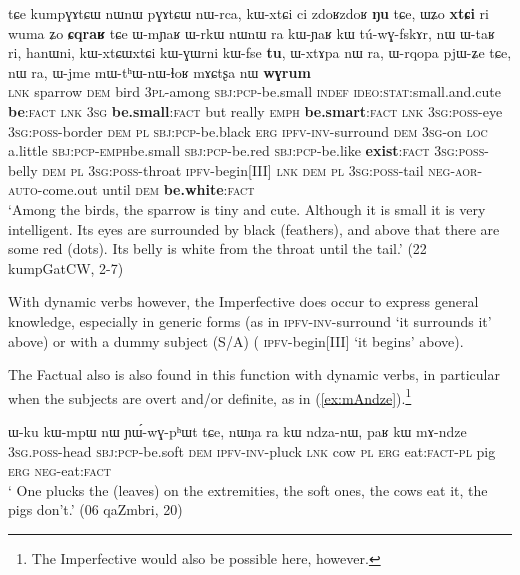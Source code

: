 \begin{exe}
\ex \label{ex:kumpGAtCW}
\gll tɕe kumpɣɤtɕɯ nɯnɯ pɣɤtɕɯ nɯ-rca, kɯ-xtɕi ci zdoʁzdoʁ \textbf{ŋu} tɕe, ɯʑo \textbf{xtɕi} ri wuma ʑo \textbf{ɕqraʁ} tɕe ɯ-mɲaʁ ɯ-rkɯ nɯnɯ ra kɯ-ɲaʁ kɯ tú-wɣ-fskɤr, nɯ ɯ-taʁ ri, hanɯni, kɯ-xtɕɯ\redp{}xtɕi kɯ-ɣɯrni kɯ-fse \textbf{tu}, ɯ-xtɤpa nɯ ra, ɯ-rqopa pjɯ-ʑe tɕe, nɯ ra, ɯ-jme mɯ-tʰɯ-nɯ-ɬoʁ mɤɕtʂa nɯ \textbf{wɣrum}  \\
\textsc{lnk} sparrow \textsc{dem} bird \textsc{3pl}-among \textsc{sbj}:\textsc{pcp}-be.small \textsc{indef} \textsc{ideo}:\textsc{stat}:small.and.cute \textbf{be}:\textsc{fact} \textsc{lnk}  \textsc{3sg} \textbf{be.small}:\textsc{fact} but really \textsc{emph} \textbf{be.smart}:\textsc{fact}  \textsc{lnk}  \textsc{3sg}:\textsc{poss}-eye \textsc{3sg}:\textsc{poss}-border \textsc{dem}  \textsc{pl}  \textsc{sbj}:\textsc{pcp}-be.black \textsc{erg} \textsc{ipfv}-\textsc{inv}-surround \textsc{dem} \textsc{3sg}-on \textsc{loc} a.little \textsc{sbj}:\textsc{pcp}-\textsc{emph}\redp{}be.small \textsc{sbj}:\textsc{pcp}-be.red \textsc{sbj}:\textsc{pcp}-be.like \textbf{exist}:\textsc{fact} \textsc{3sg}:\textsc{poss}-belly \textsc{dem}  \textsc{pl}  \textsc{3sg}:\textsc{poss}-throat \textsc{ipfv}-begin[III] \textsc{lnk}   \textsc{dem}  \textsc{pl}  \textsc{3sg}:\textsc{poss}-tail \textsc{neg}-\textsc{aor}-\textsc{auto}-come.out until \textsc{dem} \textbf{be.white}:\textsc{fact} \\
\glt `Among the birds, the sparrow is tiny and cute. Although it is small it is very intelligent. Its eyes are surrounded by black (feathers), and above that there are some red (dots). Its belly is white from the throat until the tail.' (22 kumpGatCW, 2-7)
\end{exe}

With dynamic verbs however, the Imperfective does occur to express general knowledge, especially in generic forms (as in   \textsc{ipfv}-\textsc{inv}-surround  `it surrounds it' above)  or with a dummy subject (S/A) ( \textsc{ipfv}-begin[III] `it begins' above). 
 
The Factual also is also found in this function with dynamic verbs, in particular when the subjects are overt and/or definite, as in (\ref{ex:mAndze}).\footnote{The Imperfective would also be possible here, however. }

\begin{exe}
\ex \label{ex:mAndze}
\gll ɯ-ku kɯ-mpɯ nɯ ɲɯ́-wɣ-pʰɯt tɕe, nɯŋa ra kɯ ndza-nɯ, paʁ kɯ mɤ-ndze \\
\textsc{3sg}.\textsc{poss}-head \textsc{sbj}:\textsc{pcp}-be.soft \textsc{dem} \textsc{ipfv}-\textsc{inv}-pluck \textsc{lnk} cow \textsc{pl} \textsc{erg} eat:\textsc{fact}-\textsc{pl} pig \textsc{erg} \textsc{neg}-eat:\textsc{fact} \\
\glt ` One plucks the (leaves) on the extremities, the soft ones, the cows eat it, the pigs don't.' (06 qaZmbri, 20)
\end{exe}
 
